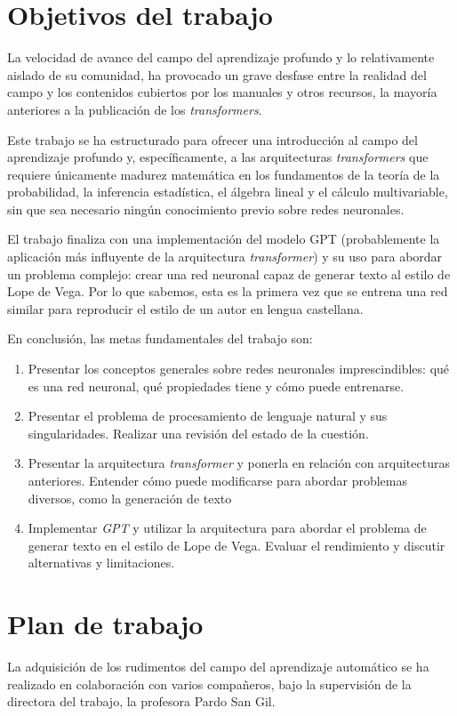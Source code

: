 \section{Objetivos del trabajo}
La velocidad de avance del campo del aprendizaje profundo y lo relativamente aislado de su comunidad, ha provocado un grave desfase entre la realidad del campo y los contenidos cubiertos por los manuales y otros recursos, la mayoría anteriores a la publicación de los \textit{transformers}.

Este trabajo se ha estructurado para ofrecer una introducción al campo del aprendizaje profundo y, específicamente, a las arquitecturas \textit{transformers} que requiere únicamente madurez matemática en los fundamentos de la teoría de la probabilidad, la inferencia estadística, el álgebra lineal y el cálculo multivariable, sin que sea necesario ningún conocimiento previo sobre redes neuronales.

El trabajo finaliza con una implementación del modelo GPT (probablemente la aplicación más influyente de la arquitectura \textit{transformer}) y su uso para abordar un problema complejo: crear una red neuronal capaz de generar texto al estilo de Lope de Vega. Por lo que sabemos, esta es la primera vez que se entrena una red similar para reproducir el estilo de un autor en lengua castellana. 

En conclusión, las metas fundamentales del trabajo son:
\begin{enumerate}[label=(O\arabic*)]
    \setlength{\itemsep}{0pt}
    \setlength{\parskip}{0pt}
    \item Presentar los conceptos generales sobre redes neuronales imprescindibles: qué es una red neuronal, qué propiedades tiene y cómo puede entrenarse.
    \item Presentar el problema de procesamiento de lenguaje natural y sus singularidades. Realizar una revisión del estado de la cuestión.
    \item Presentar la arquitectura \textit{transformer} y ponerla en relación con arquitecturas anteriores. Entender cómo puede modificarse para abordar problemas diversos, como la generación de texto
    \item Implementar \textit{GPT} y utilizar la arquitectura para abordar el problema de generar texto en el estilo de Lope de Vega. Evaluar el rendimiento y discutir alternativas y limitaciones.
\end{enumerate}

\section{Plan de trabajo}
La adquisición de los rudimentos del campo del aprendizaje automático se ha realizado en colaboración con varios compañeros, bajo la supervisión de la directora del trabajo, la profesora Pardo San Gil. 

